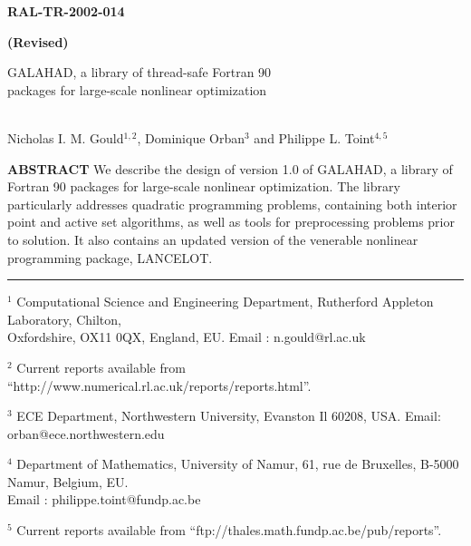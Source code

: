\documentclass[twoside]{article}
\title{\papertitle}
\author{\paperauthor}
\newcommand{\gal}{{\sf GALAHAD}}
\newcommand{\lan}{{\sf LANCELOT}}
\newcommand{\theabstract}{We describe the
design of version 1.0 of \gal, a library of Fortran 90 packages for
large-scale nonlinear optimization.
The library particularly addresses quadratic programming problems,
containing both interior point and active set algorithms, as well as
tools for preprocessing problems prior to solution.
It also contains an updated version of the venerable nonlinear
programming package, \lan.}
\begin{document}
%


\begin{titlepage}

\begin{flushright} {\large \bf RAL-TR-2002-014} \end{flushright}
\vspace*{-0.6 cm}
\begin{flushright} {\large \bf (Revised)} \end{flushright}
\vspace*{0.2 cm}

{\LARGE \bf
\begin{center}
\gal, a library of thread-safe Fortran 90 \\
packages for large-scale nonlinear optimization
\end{center}}
\vspace*{0.1 cm}
\begin{center}
\mbox{} \\
      Nicholas I. M. Gould$^{1,2}$,
      Dominique Orban$^{3}$
      and
      Philippe L. Toint$^{4,5}$
\\
\end{center}

\vspace{0.4cm}

\begin{center}
\parbox{\textwidth}{
{
{\bf  ABSTRACT \newline}
\theabstract}
}
\end{center}

\vspace{0.2 cm}

\noindent \rule{\textwidth}{0.001in}
\vspace{0.1 cm}

{\small
\begin{description}
\item  $^1$ Computational Science and Engineering Department,
       Rutherford Appleton Laboratory,
       Chilton, \\ Oxfordshire, OX11 0QX, England, EU.
       Email : n.gould@rl.ac.uk
\item  $^2$ Current reports available from %
       ``http://www.numerical.rl.ac.uk/reports/reports.html''.
\item $^3$ ECE Department,  Northwestern University, Evanston Il 60208, USA.
       Email: orban@ece.northwestern.edu
\item  $^4$ Department of Mathematics, University of Namur,
       61, rue de Bruxelles, B-5000 Namur, Belgium, EU. \\
       Email : philippe.toint@fundp.ac.be
\item  $^5$ Current reports available from %
       ``ftp://thales.math.fundp.ac.be/pub/reports''.
\end{description}
}


\end{titlepage}
\end{document}
